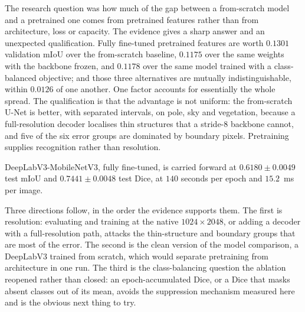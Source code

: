The research question was how much of the gap between a from-scratch model and a pretrained one
comes from pretrained features rather than from architecture, loss or capacity. The evidence
gives a sharp answer and an unexpected qualification. Fully fine-tuned pretrained features are
worth $0.1301$ validation mIoU over the from-scratch baseline, $0.1175$ over the same weights
with the backbone frozen, and $0.1178$ over the same model trained with a class-balanced
objective; and those three alternatives are mutually indistinguishable, within $0.0126$ of one
another. One factor accounts for essentially the whole spread. The qualification is that the
advantage is not uniform: the from-scratch U-Net is better, with separated intervals, on pole,
sky and vegetation, because a full-resolution decoder localises thin structures that a stride-8
backbone cannot, and five of the six error groups are dominated by boundary pixels. Pretraining
supplies recognition rather than resolution.

DeepLabV3-MobileNetV3, fully fine-tuned, is carried forward at
$\mathbf{0.6180 \pm 0.0049}$ test mIoU and $0.7441 \pm 0.0048$ test Dice, at $140$ seconds per
epoch and $15.2$~ms per image.

Three directions follow, in the order the evidence supports them. The first is resolution:
evaluating and training at the native $1024 \times 2048$, or adding a decoder with a
full-resolution path, attacks the thin-structure and boundary groups that are most of the error.
The second is the clean version of the model comparison, a DeepLabV3 trained from scratch,
which would separate pretraining from architecture in one run. The third is the class-balancing question the ablation
reopened rather than closed: an epoch-accumulated Dice, or a Dice that masks absent classes out
of its mean, avoids the suppression mechanism measured here and is the obvious next thing to try.
